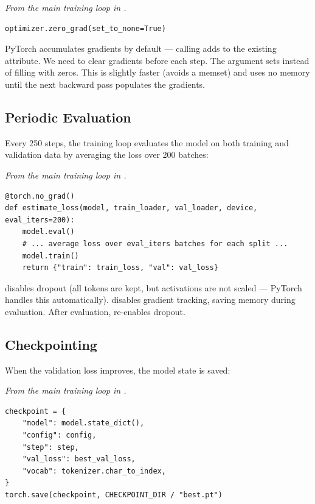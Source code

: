\concepttag
{\small\itshape From the main training loop in .}
\begin{lstlisting}
optimizer.zero_grad(set_to_none=True)
\end{lstlisting}

PyTorch accumulates gradients by default --- calling  adds to the existing  attribute. We need to clear gradients before each step. The  argument sets  instead of filling with zeros. This is slightly faster (avoids a memset) and uses no memory until the next backward pass populates the gradients.

\subsection{Periodic Evaluation}

Every 250 steps, the training loop evaluates the model on both training and validation data by averaging the loss over 200 batches:

\concepttag
{\small\itshape From the main training loop in .}
\begin{lstlisting}
@torch.no_grad()
def estimate_loss(model, train_loader, val_loader, device, eval_iters=200):
    model.eval()
    # ... average loss over eval_iters batches for each split ...
    model.train()
    return {"train": train_loss, "val": val_loss}
\end{lstlisting}

 disables dropout (all tokens are kept, but activations are not scaled --- PyTorch handles this automatically).  disables gradient tracking, saving memory during evaluation. After evaluation,  re-enables dropout.

\subsection{Checkpointing}

When the validation loss improves, the model state is saved:

\concepttag
{\small\itshape From the main training loop in .}
\begin{lstlisting}
checkpoint = {
    "model": model.state_dict(),
    "config": config,
    "step": step,
    "val_loss": best_val_loss,
    "vocab": tokenizer.char_to_index,
}
torch.save(checkpoint, CHECKPOINT_DIR / "best.pt")
\end{lstlisting}

